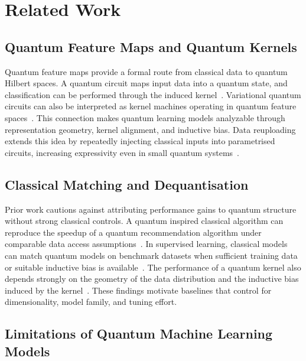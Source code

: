 \documentclass[12pt]{article}
\begin{document}
\section{Related Work}
\label{sec:related}

\subsection{Quantum Feature Maps and Quantum Kernels}

Quantum feature maps provide a formal route from classical data to quantum
Hilbert spaces. A quantum circuit maps input data into a quantum state, and
classification can be performed through the induced kernel~\citep{havlicek2019}.
Variational quantum circuits can also be interpreted as kernel machines
operating in quantum feature spaces~\citep{schuld2019}. This connection makes
quantum learning models analyzable through representation geometry, kernel
alignment, and inductive bias. Data reuploading extends this idea by repeatedly
injecting classical inputs into parametrised circuits, increasing expressivity
even in small quantum systems~\citep{perez2020}.

\subsection{Classical Matching and Dequantisation}

Prior work cautions against attributing performance gains to quantum structure
without strong classical controls. A quantum inspired classical algorithm can
reproduce the speedup of a quantum recommendation algorithm under comparable
data access assumptions~\citep{tang2019}. In supervised learning, classical
models can match quantum models on benchmark datasets when sufficient training
data or suitable inductive bias is available~\citep{huang2021}. The performance
of a quantum kernel also depends strongly on the geometry of the data
distribution and the inductive bias induced by the kernel~\citep{kubler2021}.
These findings motivate baselines that control for dimensionality, model family,
and tuning effort.

\subsection{Limitations of Quantum Machine Learning Models}
\end{document}
